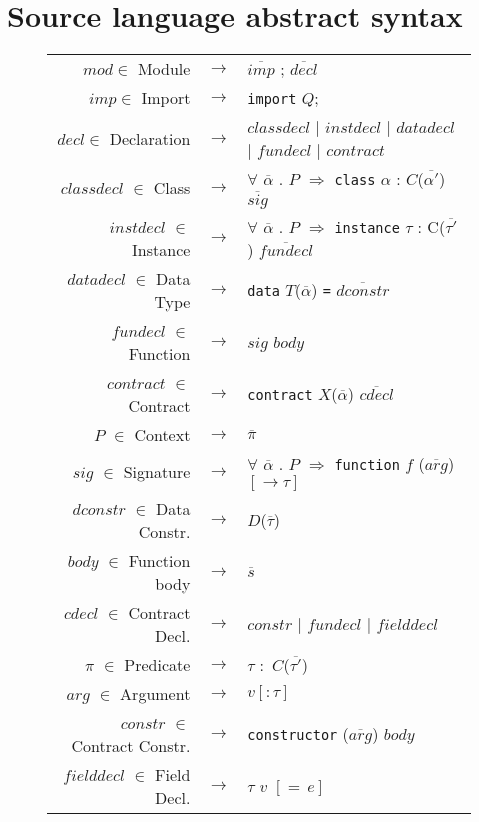\documentclass[a4paper, 11pt]{article}
\begin{document}
\section{Source language abstract syntax}\label{sec:source-abstract-syntax}

\begin{figure}[H] 
  \begin{tabular}{rcl}
    $mod \in $ Module & $\to$ & $\overline{imp}$ ; $\overline{decl}$\\
    $imp \in$ Import & $\to$ & \texttt{import} $Q$; \\
    $decl \in$ Declaration & $\to$ & $classdecl$ $|$ $instdecl$ $|$ $datadecl$ $|$ $fundecl$ $|$ $contract$ \\
    $classdecl$ $\in$ Class & $\to$ & $\forall$ $\overline{\alpha}$ $.$ $P$ $\Rightarrow$ \texttt{class} $\alpha$ : $C$($\overline{\alpha'}$) $\overline{sig}$\\  
    $instdecl$ $\in$ Instance & $\to$ & $\forall$ $\overline{\alpha}$ $.$ $P$ $\Rightarrow$ \texttt{instance} $\tau$ : C($\overline{\tau'}$) $\overline{fundecl}$\\ 
    $datadecl$ $\in$ Data Type & $\to$ & \texttt{data} $T$($\overline{\alpha}$) \texttt{=} $\overline{dconstr}$\\
    $fundecl$ $\in$ Function & $\to$ & $sig$ $body$ \\
    $contract$ $\in$ Contract & $\to$ & \texttt{contract} $X$($\overline{\alpha}$) $\overline{cdecl}$ \\
    $P$ $\in$ Context & $\to$ & $\overline{\pi}$\\ 
    $sig$ $\in$ Signature & $\to$ & $\forall$ $\overline{\alpha}$ $.$ $P$ $\Rightarrow$ \texttt{function} $f$ ($\overline{arg}$) $[\to\tau]$\\ 
    $dconstr$ $\in$ Data Constr. & $\to$ & $D$($\overline{\tau}$)\\
    $body$ $\in$ Function body & $\to$ & $\overline{s}$\\ 
    $cdecl$ $\in$ Contract Decl. & $\to$ & $constr$ $|$ $fundecl$ $|$ $fielddecl$\\
    $\pi$ $\in$ Predicate & $\to$ & $\tau$ $:$ $C$($\overline{\tau'}$)\\
    $arg$ $\in$ Argument & $\to$ & $v [:\tau]$\\
    $constr$ $\in$ Contract Constr. & $\to$ & \texttt{constructor} ($\overline{arg}$) $body$ \\ 
    $fielddecl$ $\in$ Field Decl. & $\to$ & $\tau$ $v$ $[=\,e]$\\ 

\end{tabular}
\end{figure}
\end{document}
